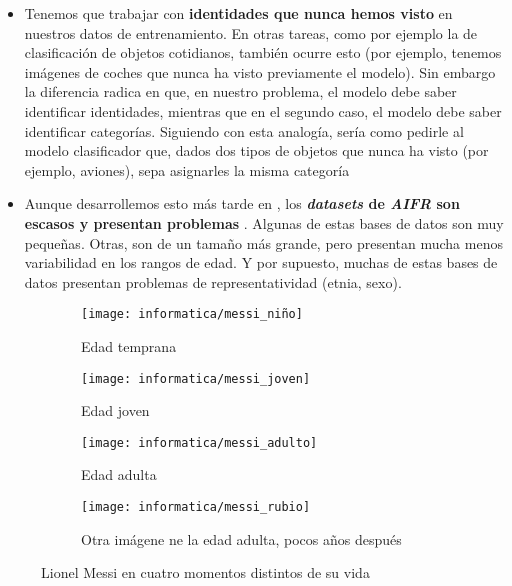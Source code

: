 \begin{itemize}
\item Tenemos que trabajar con \textbf{identidades que nunca hemos visto} en nuestros datos de entrenamiento. En otras tareas, como por ejemplo la de clasificación de objetos cotidianos, también ocurre esto (por ejemplo, tenemos imágenes de coches que nunca ha visto previamente el modelo). Sin embargo la diferencia radica en que, en nuestro problema, el modelo debe saber identificar identidades, mientras que en el segundo caso, el modelo debe saber identificar categorías. Siguiendo con esta analogía, sería como pedirle al modelo clasificador que, dados dos tipos de objetos que nunca ha visto (por ejemplo, aviones), sepa asignarles la misma categoría

\item Aunque desarrollemos esto más tarde en , los \textbf{\textit{datasets} de \textit{AIFR} son escasos y presentan problemas} \cite{informatica:tecnica_sintesis_aifr}. Algunas de estas bases de datos son muy pequeñas. Otras, son de un tamaño más grande, pero presentan mucha menos variabilidad en los rangos de edad. Y por supuesto, muchas de estas bases de datos presentan problemas de representatividad (etnia, sexo).
\end{itemize}

\begin{figure}[H]
\centering
    \begin{subfigure}{0.5\textwidth}
        \centering
        \texttt{[image: informatica/messi\_niño]}
        \caption{Edad temprana}
        \label{img:messi_pequeño}
    \end{subfigure}%
    \begin{subfigure}{.5\textwidth}
        \centering
        \texttt{[image: informatica/messi\_joven]}
        \caption{Edad joven}
    \end{subfigure}%

    \begin{subfigure}{.5\textwidth}
        \centering
        \texttt{[image: informatica/messi\_adulto]}
        \caption{Edad adulta}
        \label{img:messi_adulto}
    \end{subfigure}%
    \begin{subfigure}{.5\textwidth}
        \centering
        \texttt{[image: informatica/messi\_rubio]}
        \caption{Otra imágene ne la edad adulta, pocos años después}
    \end{subfigure}

    \caption{Lionel Messi en cuatro momentos distintos de su vida}
    \label{img:messi_cuatro_edades}

\end{figure}

